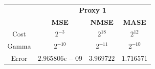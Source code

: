 \begin{center}
\begin{tabular}{|c|c|c|c|}
\hline
& \multicolumn{3}{|c|}{\textbf{Proxy 1}} \\ \cline{2-4}
& \textbf{MSE} & \textbf{NMSE} & \textbf{MASE} \\ \hline
Cost  &  $2^{-3}$        & $2^{18}$    & $2^{12}$       \\ 
Gamma &  $2^{-10}$       & $2^{-11}$   & $2^{-10}$      \\ 
Error &  $2.965806e-09$  & $3.969722$  & $1.716571$     \\ 
\hline
\end{tabular}


 \begin{figure}[!h]
\centering
{}
\end{figure}
\end{center}
